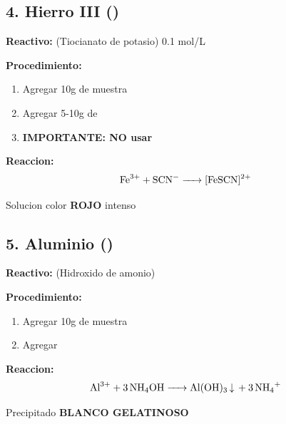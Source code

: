\documentclass[11pt,a4paper]{article}
\begin{document}
\subsection{4. Hierro III ()}

\textbf{Reactivo:}  (Tiocianato de potasio) 0.1 mol/L

\textbf{Procedimiento:}
\begin{enumerate}[leftmargin=*]
    \item Agregar 10g de muestra
    \item Agregar 5-10g de 
    \item \textbf{IMPORTANTE: NO usar }
\end{enumerate}

\begin{reaccionbox}
\textbf{Reaccion:}
\begin{equation*}
\ce{Fe^{3+} + SCN^- -> [FeSCN]^{2+}}
\end{equation*}
\end{reaccionbox}

\begin{resultado}
Solucion color \textbf{\textcolor{rojo}{ROJO}} intenso
\end{resultado}

\subsection{5. Aluminio ()}

\textbf{Reactivo:}  (Hidroxido de amonio)

\textbf{Procedimiento:}
\begin{enumerate}[leftmargin=*]
    \item Agregar 10g de muestra
    \item Agregar 
\end{enumerate}

\begin{reaccionbox}
\textbf{Reaccion:}
\begin{equation*}
\ce{Al^{3+} + 3NH4OH -> Al(OH)3 v + 3NH4^+}
\end{equation*}
\end{reaccionbox}

\begin{resultado}
Precipitado \textbf{BLANCO GELATINOSO}
\end{resultado}
\end{document}
